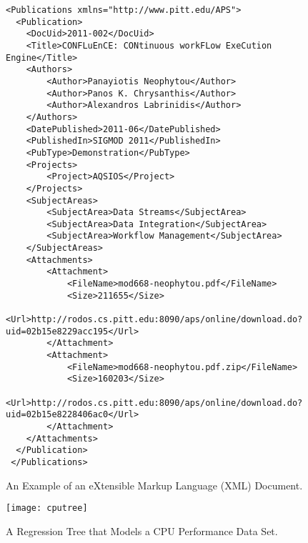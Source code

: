 \documentclass[12pt]{article}
\begin{document}
\begin{figure}[p]

\vspace*{-.5in}

\centering

{\footnotesize 
\begin{verbatim}
<Publications xmlns="http://www.pitt.edu/APS">
  <Publication>
    <DocUid>2011-002</DocUid>
    <Title>CONFLuEnCE: CONtinuous workFLow ExeCution Engine</Title>
    <Authors>
        <Author>Panayiotis Neophytou</Author>
        <Author>Panos K. Chrysanthis</Author>
        <Author>Alexandros Labrinidis</Author>
    </Authors>
    <DatePublished>2011-06</DatePublished>
    <PublishedIn>SIGMOD 2011</PublishedIn>
    <PubType>Demonstration</PubType>
    <Projects>
        <Project>AQSIOS</Project>
    </Projects>
    <SubjectAreas>
        <SubjectArea>Data Streams</SubjectArea>
        <SubjectArea>Data Integration</SubjectArea>
        <SubjectArea>Workflow Management</SubjectArea>
    </SubjectAreas>
    <Attachments>
        <Attachment>
            <FileName>mod668-neophytou.pdf</FileName>
            <Size>211655</Size>
            <Url>http://rodos.cs.pitt.edu:8090/aps/online/download.do?uid=02b15e8229acc195</Url>
        </Attachment>
        <Attachment>
            <FileName>mod668-neophytou.pdf.zip</FileName>
            <Size>160203</Size>
            <Url>http://rodos.cs.pitt.edu:8090/aps/online/download.do?uid=02b15e8228406ac0</Url>
        </Attachment>
    </Attachments>
  </Publication>
 </Publications>
\end{verbatim} }

\caption{An Example of an eXtensible Markup Language (XML) Document.}
\label{figure:xml}
\end{figure}

\begin{figure}[p]
\centering

\vspace*{-.6in}

\begin{center}
\texttt{[image: cputree]}
\end{center}

\vspace*{-.65in}

\caption{A Regression Tree that Models a CPU Performance Data Set.}
\label{figure:tree}
\vspace*{-.25in}
\end{figure}
\end{document}
